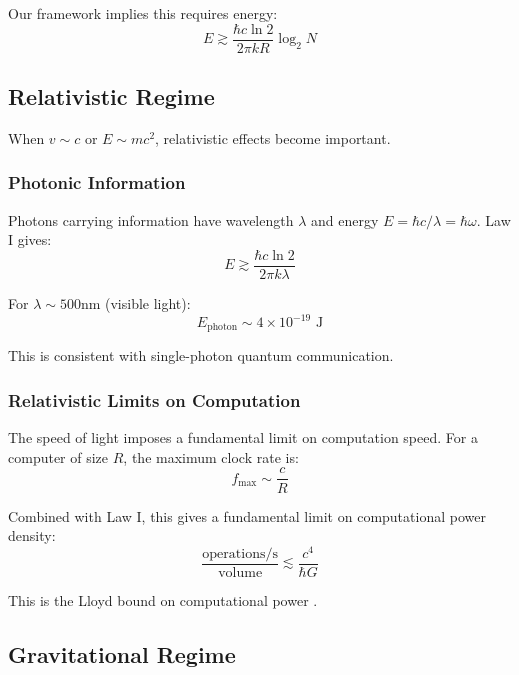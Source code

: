 \documentclass[11pt,a4paper]{article}
\theoremstyle{plain}
\theoremstyle{definition}
\theoremstyle{remark}
\begin{document}
Our framework implies this requires energy:
\begin{equation}
E \gtrsim \frac{\hbar c\ln 2}{2\pi kR}\log_2 N
\end{equation}

\subsection{Relativistic Regime}

When $v \sim c$ or $E \sim mc^2$, relativistic effects become important.

\subsubsection{Photonic Information}

Photons carrying information have wavelength $\lambda$ and energy $E = \hbar c/\lambda = \hbar\omega$. Law I gives:
\begin{equation}
E \gtrsim \frac{\hbar c\ln 2}{2\pi k\lambda}
\end{equation}

For $\lambda \sim 500$nm (visible light):
\begin{equation}
E_{\text{photon}} \sim 4\times 10^{-19}\text{ J}
\end{equation}

This is consistent with single-photon quantum communication.

\subsubsection{Relativistic Limits on Computation}

The speed of light imposes a fundamental limit on computation speed. For a computer of size $R$, the maximum clock rate is:
\begin{equation}
f_{\max} \sim \frac{c}{R}
\end{equation}

Combined with Law I, this gives a fundamental limit on computational power density:
\begin{equation}
\frac{\text{operations/s}}{\text{volume}} \lesssim \frac{c^4}{\hbar G}
\end{equation}

This is the Lloyd bound on computational power \cite{lloyd2000ultimate}.

\subsection{Gravitational Regime}
\end{document}
